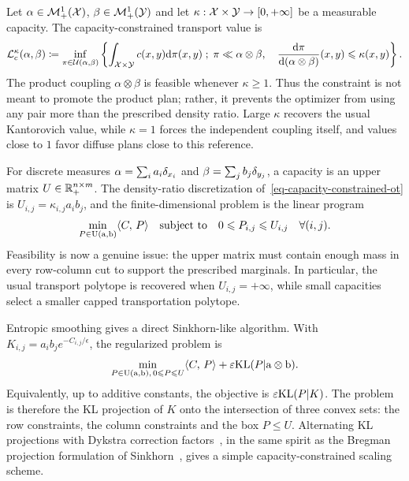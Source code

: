 Let $\alpha\in\mathcal{M}_+^1(\mathcal{X})$, $\beta\in\mathcal{M}_+^1(\mathcal{Y})$ and let $\kappa:\mathcal{X}\times\mathcal{Y}\to[0,+\infty]$ be a measurable capacity. The capacity-constrained transport value is
\begin{equation}\label{eq-capacity-constrained-ot}
	\mathcal{L}_c^\kappa(\alpha,\beta)
	\coloneqq
	\inf_{\pi\in\mathcal{U}(\alpha,\beta)}
	\left\{ 
		\int_{\mathcal{X}\times\mathcal{Y}} c(x,y)\mathrm{d}\pi(x,y)
	 \;;\; 
		\pi\ll\alpha\otimes\beta,\quad
		\frac{\mathrm{d}\pi}{\mathrm{d}(\alpha\otimes\beta)}(x,y)\leqslant\kappa(x,y)
	 \right\}.
\end{equation}
The product coupling $\alpha\otimes\beta$ is feasible whenever $\kappa\geq1$. Thus the constraint is not meant to promote the product plan; rather, it prevents the optimizer from using any pair more than the prescribed density ratio. Large $\kappa$ recovers the usual Kantorovich value, while $\kappa=1$ forces the independent coupling itself, and values close to $1$ favor diffuse plans close to this reference.

For discrete measures $\alpha=\sum_i a_i\delta_{x_i}$ and $\beta=\sum_j b_j\delta_{y_j}$, a capacity is an upper matrix $U\in\mathbb{R}_+^{n\times m}$. The density-ratio discretization of~\eqref{eq-capacity-constrained-ot} is $U_{i,j}=\kappa_{i,j}a_i b_j$, and the finite-dimensional problem is the linear program
\begin{equation}\label{eq-discrete-capacity-constrained-ot}
	\min_{P\in\mathrm{U}(\mathrm{a},\mathrm{b})}
	\langle C,\,P\rangle
	\quad\text{subject to}\quad
	0\leqslant P_{i,j}\leqslant U_{i,j}\quad\forall(i,j).
\end{equation}
Feasibility is now a genuine issue: the upper matrix must contain enough mass in every row-column cut to support the prescribed marginals. In particular, the usual transport polytope is recovered when $U_{i,j}=+\infty$, while small capacities select a smaller capped transportation polytope.

Entropic smoothing gives a direct Sinkhorn-like algorithm. With $K_{i,j}=a_i b_j e^{-C_{i,j}/\epsilon}$, the regularized problem is
\begin{equation}\label{eq-entropic-capacity-constrained-ot}
	\min_{P\in\mathrm{U}(\mathrm{a},\mathrm{b}),\,0\leqslant P\leqslant U}
	\langle C,\,P\rangle
	+
	\varepsilon\mathrm{KL}(P|\mathrm{a}\otimes\mathrm{b}).
\end{equation}
Equivalently, up to additive constants, the objective is $\varepsilon\mathrm{KL}(P|K)$. The problem is therefore the KL projection of $K$ onto the intersection of three convex sets: the row constraints, the column constraints and the box $P\leq U$. Alternating KL projections with Dykstra correction factors~\cite{Dykstra85,bauschke-lewis}, in the same spirit as the Bregman projection formulation of Sinkhorn~\cite{2015-benamou-cisc}, gives a simple capacity-constrained scaling scheme.

